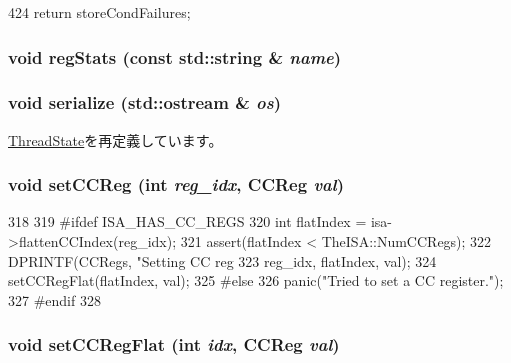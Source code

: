 \begin{DoxyCode}
424 { return storeCondFailures; }
\end{DoxyCode}
\hypertarget{classSimpleThread_a3dd3443357312bcb75580eaa508c48a4}{
\subsubsection[{regStats}]{\setlength{\rightskip}{0pt plus 5cm}void regStats (const std::string \& {\em name})}}
\label{classSimpleThread_a3dd3443357312bcb75580eaa508c48a4}
\hypertarget{classSimpleThread_a53e036786d17361be4c7320d39c99b84}{
\subsubsection[{serialize}]{\setlength{\rightskip}{0pt plus 5cm}void serialize (std::ostream \& {\em os})}}
\label{classSimpleThread_a53e036786d17361be4c7320d39c99b84}


\hyperlink{structThreadState_a53e036786d17361be4c7320d39c99b84}{ThreadState}を再定義しています。\hypertarget{classSimpleThread_afd6c42b1888ad21a4382078ca7a86d09}{
\subsubsection[{setCCReg}]{\setlength{\rightskip}{0pt plus 5cm}void setCCReg (int {\em reg\_\-idx}, \/  {\bf CCReg} {\em val})}}
\label{classSimpleThread_afd6c42b1888ad21a4382078ca7a86d09}



\begin{DoxyCode}
318     {
319 #ifdef ISA_HAS_CC_REGS
320         int flatIndex = isa->flattenCCIndex(reg_idx);
321         assert(flatIndex < TheISA::NumCCRegs);
322         DPRINTF(CCRegs, "Setting CC reg %
323                 reg_idx, flatIndex, val);
324         setCCRegFlat(flatIndex, val);
325 #else
326         panic("Tried to set a CC register.");
327 #endif
328     }
\end{DoxyCode}
\hypertarget{classSimpleThread_a6dec2284dd5904f992642f24bb289f14}{
\subsubsection[{setCCRegFlat}]{\setlength{\rightskip}{0pt plus 5cm}void setCCRegFlat (int {\em idx}, \/  {\bf CCReg} {\em val})}}
\label{classSimpleThread_a6dec2284dd5904f992642f24bb289f14}



